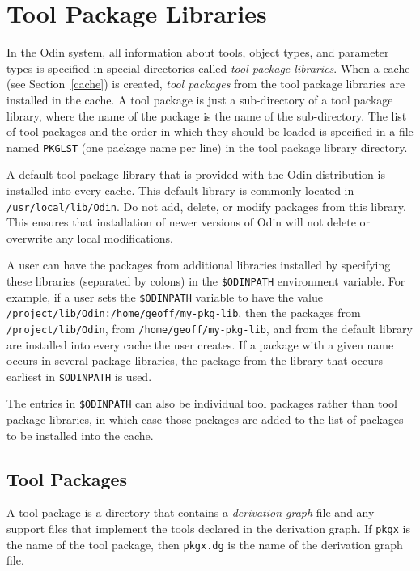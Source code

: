 \documentclass[hidelinks]{report}
\newcommand{\ex}{\tt}   %
\begin{document}
\chapter{Tool Package Libraries}
\label{library}


In the Odin system, all information about tools, object types,
and parameter types
is specified in special directories called {\em tool package libraries}.
When a cache (see Section~\ref{cache}) is created,
{\em tool packages} from the tool package libraries
are installed in the cache.
A tool package is just a sub-directory of a tool package library,
where the name of the package is the name of the sub-directory.
The list of tool packages and the order in which they should be loaded
is specified in a file named {\ex PKGLST} (one package name per line)
in the tool package library directory.

A default tool package library that is provided with the Odin distribution
is installed into every cache.
This default library is commonly located in {\ex /usr/local/lib/Odin}.
Do not add, delete, or modify packages from this library.
This ensures that installation of newer versions of Odin will not
delete or overwrite any local modifications.

A user can have the packages from additional libraries installed
by specifying these libraries (separated by colons)
in the {\ex \$ODINPATH} environment variable.
For example, if a user sets the {\ex \$ODINPATH} variable to have the value
{\ex /project/lib/Odin:/home/geoff/my-pkg-lib},
then the packages from {\ex /project/lib/Odin},
from {\ex /home/geoff/my-pkg-lib}, and from the default library
are installed into every cache the user creates.
If a package with a given name occurs in several package libraries,
the package from the library that occurs earliest in {\ex \$ODINPATH} is used.

The entries in {\ex \$ODINPATH} can also be individual tool packages
rather than tool package libraries,
in which case those packages are added to the list of packages to be
installed into the cache.


\section{Tool Packages}
\label{package}

A tool package is a directory that contains a {\em derivation graph} file
and any support files that implement the tools
declared in the derivation graph.
If {\ex pkgx} is the name of the tool package,
then {\ex pkgx.dg} is the name of the derivation graph file.
\end{document}
